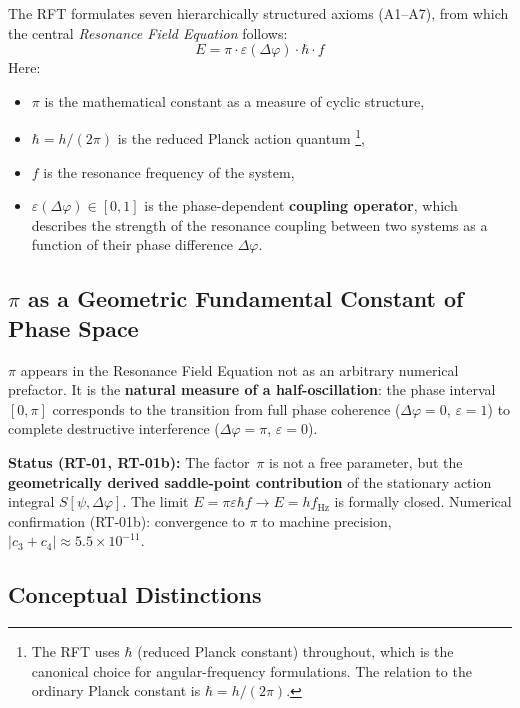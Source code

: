 \documentclass[a4paper,11pt]{article}
\begin{document}
	The RFT formulates seven hierarchically structured axioms
	(A1--A7), from which the central
	\textit{Resonance Field Equation} follows:
	\begin{equation}
		E = \pi \cdot \varepsilon(\Delta\varphi) \cdot \hbar \cdot f
	\end{equation}
	Here:
	\begin{itemize}
		\item $\pi$ is the mathematical constant as a measure of cyclic structure,
		\item $\hbar = h/(2\pi)$ is the reduced Planck action quantum%
		      \footnote{The RFT uses $\hbar$ (reduced Planck constant) throughout,
		      which is the canonical choice for angular-frequency formulations.
		      The relation to the ordinary Planck constant is $\hbar = h/(2\pi)$.},
		\item $f$ is the resonance frequency of the system,
		\item $\varepsilon(\Delta\varphi) \in [0,1]$ is the
		phase-dependent \textbf{coupling operator}, which describes the
		strength of the resonance coupling between two systems
		as a function of their phase difference $\Delta\varphi$.
	\end{itemize}
	
	\subsection{\texorpdfstring{$\pi$}{pi} as a Geometric Fundamental Constant of Phase Space}

	$\pi$ appears in the Resonance Field Equation not as an arbitrary numerical
	prefactor. It is the \textbf{natural measure of a half-oscillation}: the phase
	interval $[0,\pi]$ corresponds to the transition from full phase coherence
	($\Delta\varphi = 0$, $\varepsilon = 1$) to complete destructive interference
	($\Delta\varphi = \pi$, $\varepsilon = 0$).

	\textbf{Status (RT-01, RT-01b):} The factor~$\pi$ is not a free parameter,
	but the \textbf{geometrically derived saddle-point contribution} of the stationary
	action integral $S[\psi, \Delta\varphi]$. The limit
	$E = \pi\varepsilon\hbar f \to E = hf_{\mathrm{Hz}}$ is formally closed.
	Numerical confirmation (RT-01b): convergence to $\pi$ to machine precision,
	$|c_3 + c_4| \approx 5.5 \times 10^{-11}$.

	\subsection{Conceptual Distinctions}
	
\end{document}

